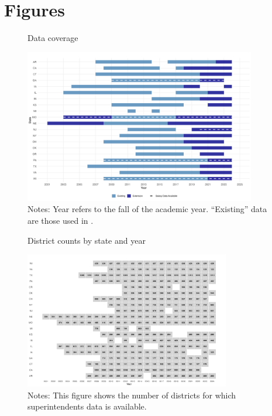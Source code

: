 \documentclass[12pt]{article}
\begin{document}
\section*{Figures}
\begin{figure}[H]
\caption{Data coverage}
    \label{fig:state_years_plot}
    \centering
    \includegraphics[width=0.9\textwidth]{figures/state_years_plot.png}
    \caption*{\footnotesize Notes: Year refers to the fall of the academic year. ``Existing'' data are those used in \citet{stemper}. }
\end{figure}


\begin{figure}[H]
\caption{District counts by state and year}
    \label{tab:district_counts_by_state_year}
    \centering
    \includegraphics[width=0.8\textwidth]{figures/district_counts_by_state_year.png}
     \caption*{\footnotesize Notes: This figure shows the number of districts for which superintendents data is available.}
\end{figure}
\end{document}
